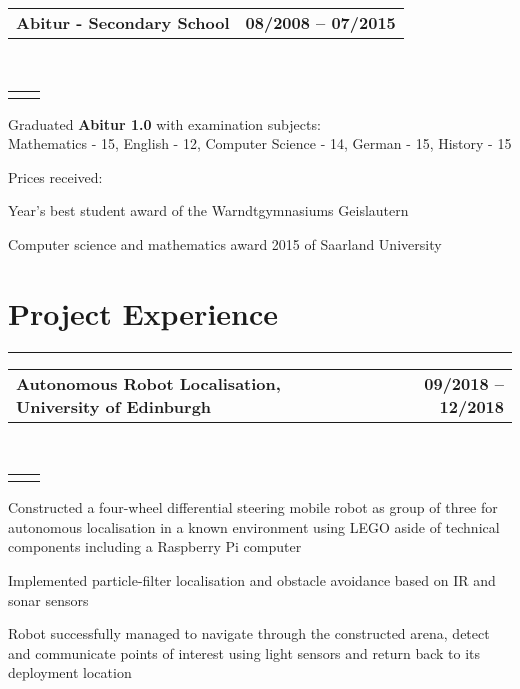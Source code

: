 \documentclass[]{deedy-resume}
\makeatletter
\newcommand{\headerrow}[2]
{\begin{tabular*}{\linewidth}{l@{\extracolsep{\fill}}r}
	\fontspec{Helvetica}\fontsize{12pt}{12pt}\selectfont\bfseries{\color{subheadings}#1} &
	\fontspec{Helvetica}\fontsize{12pt}{12pt}\selectfont\bfseries{\color{subheadings}#2} \\
\end{tabular*}}
\newcommand{\locationrow}[2]
{\begin{tabular*}{\linewidth}{l@{\extracolsep{\fill}}r}
        \color{headings}\scshape\fontspec{Heiti TC Medium}\fontsize{10pt}{12pt}\selectfont{#1}  &
        \color{headings}\scshape\fontspec{Heiti TC Medium}\fontsize{10pt}{12pt}\selectfont{#2}  \\
\end{tabular*}}
\makeatother
\begin{document}
\noindent
\headerrow{Abitur - Secondary School}{08/2008 -- 07/2015}
\\
\locationrow{Warndtgymnasium Geislautern, Völklingen}{Geislautern, Germany}
\begin{tightitemize}{1.7em}
	\item Graduated \textbf{Abitur 1.0} with examination subjects:\\
       Mathematics - 15, English - 12, Computer Science - 14, German - 15, History - 15
    \item Prices received:
    \begin{tightitemize}{0.5em}
        \item Year's best student award of the Warndtgymnasiums Geislautern
        \item Computer science and mathematics award 2015 of Saarland University
    \end{tightitemize}
\end{tightitemize}
\largesectionsep


\section*{Project Experience}
\hrule
\vspace{0.4em}

\noindent
\headerrow{Autonomous Robot Localisation, University of Edinburgh}{09/2018 -- 12/2018}
\\
\locationrow{Group Project for Robotics: Science and Systems Lecture}{}
\begin{tightitemize}{1.7em}
    \item Constructed a four-wheel differential steering mobile robot as group of three for autonomous localisation in a 
    known environment using LEGO aside of technical components including a Raspberry Pi computer
    \item Implemented particle-filter localisation and obstacle avoidance based on IR and sonar sensors
    \item Robot successfully managed to navigate through the constructed arena, detect and communicate points of
    interest using light sensors and return back to its deployment location
\end{tightitemize}
\largesectionsep
\end{document}
